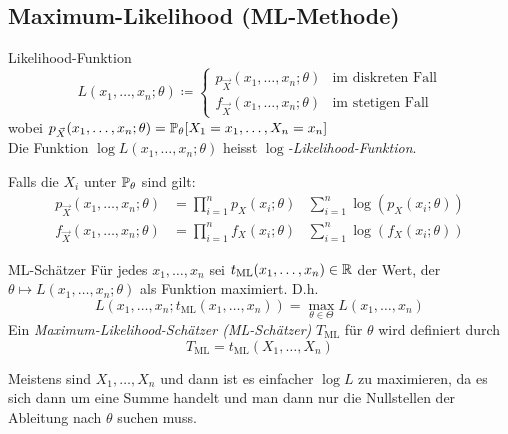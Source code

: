 \subsection*{Maximum-Likelihood (ML-Methode)}%
\label{sub:maximum_likelihood_ml_methode_}

\begin{definition}{Likelihood-Funktion}
	\begin{equation*}
		L(x_1 , \ldots , x_n ; \theta) \coloneqq 
		\begin{cases}
			p_{\vec{X}} (x_1 , \ldots , x_n; \theta) & \text{im diskreten Fall}\\
			f_{\vec{X}} (x_1 , \ldots , x_n; \theta) & \text{im stetigen Fall}
		\end{cases}
	\end{equation*}
	wobei $p_{\vec{X}} (x_1 , \ldots , x_n; \theta) = \mathbb{P}_\theta [X_1 = x_1 , \ldots , X_n = x_n]$\\
	Die Funktion $\log L(x_1 , \ldots , x_n ; \theta)$ heisst \emph{$\log$-Likelihood-Funktion}.
\end{definition}
Falls die $X_i$ unter $\mathbb{P}_\theta$ \iid sind gilt:
\begin{align*}
	p_{\vec{X}} (x_1 , \ldots , x_n; \theta) &= \prod_{i=1}^n p_X (x_i ; \theta) & \sum_{i=1}^{n} \log(p_X (x_i ; \theta))\\
	f_{\vec{X}} (x_1 , \ldots , x_n; \theta) &= \prod_{i=1}^n f_X (x_i ; \theta) & \sum_{i=1}^{n} \log(f_X (x_i ; \theta))
\end{align*}
\begin{definition}{ML-Schätzer}
	Für jedes $x_1 , \ldots , x_n$ sei $t_{\text{ML}}(x_1 , \ldots , x_n) \in \mathbb{R}$ der Wert, der $\theta \mapsto L (x_1 ,
	\ldots , x_n ; \theta)$ als Funktion maximiert. D.h.
	\begin{equation*}
		L (x_1 , \ldots , x_n ; t_{\text{ML}} (x_1, \ldots , x_n)) = \max_{\theta \in \Theta} L (x_1 , \ldots , x_n)
	\end{equation*}
	Ein \emph{Maximum-Likelihood-Schätzer (ML-Schätzer)} $T_{\text{ML}}$ für $\theta$ wird definiert durch
	\begin{equation*}
		T_{\text{ML}} = t_{\text{ML}} (X_1 , \ldots , X_n)
	\end{equation*}
\end{definition}
Meistens sind $X_1 , \ldots , X_n$ \iid und dann ist es einfacher $\log L$ zu maximieren, da es sich dann um eine Summe
handelt und man dann nur die Nullstellen der Ableitung nach $\theta$ suchen muss.

